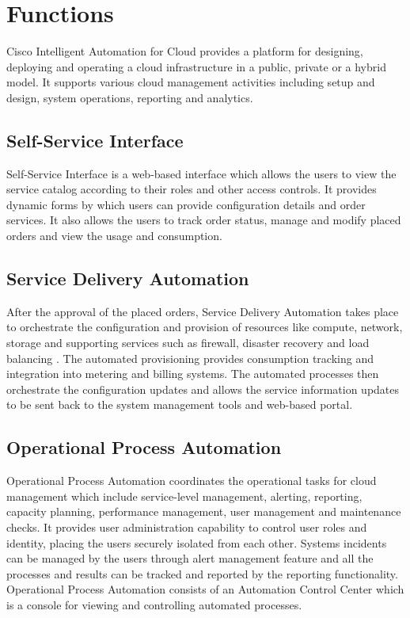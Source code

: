 \documentclass[9pt,twocolumn,twoside]{../../styles/osajnl}
\begin{document}
\section{Functions}

Cisco Intelligent Automation for Cloud provides a platform for
designing, deploying and operating a cloud infrastructure in a public,
private or a hybrid model. It supports various cloud management
activities including setup and design, system operations, reporting
and analytics.

\subsection{Self-Service Interface}

Self-Service Interface is a web-based interface which allows the users
to view the service catalog according to their roles and other access
controls. It provides dynamic forms by which users can provide
configuration details and order services. It also allows the users to
track order status, manage and modify placed orders and view the usage
and consumption.

\subsection{Service Delivery Automation}

After the approval of the placed orders, Service Delivery Automation
takes place to orchestrate the configuration and provision of
resources like compute, network, storage and supporting services such
as firewall, disaster recovery and load balancing
\cite{cisco-datasheet}. The automated provisioning provides
consumption tracking and integration into metering and billing
systems. The automated processes then orchestrate the configuration
updates and allows the service information updates to be sent back to
the system management tools and web-based portal.

\subsection{Operational Process Automation}

Operational Process Automation coordinates the operational tasks for
cloud management which include service-level management, alerting,
reporting, capacity planning, performance management, user management
and maintenance checks. It provides user administration capability to
control user roles and identity, placing the users securely isolated
from each other. Systems incidents can be managed by the users through
alert management feature and all the processes and results can be
tracked and reported by the reporting functionality. Operational
Process Automation consists of an Automation Control Center which is a
console for viewing and controlling automated processes.
\end{document}
